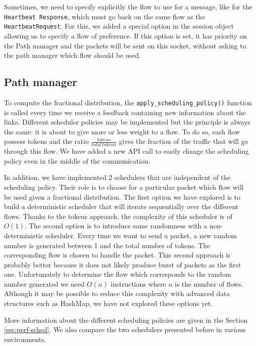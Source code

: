 Sometimes, we need to specify explicitly the flow to use for a message, like for the \texttt{Heartbeat Response}, which must go back on the same flow as the \texttt{HeartbeatRequest}. For this, we added a special option in the session object allowing us to specify a flow of preference. If this option is set, it has priority on the Path manager and the packets will be sent on this socket, without asking to the path manager which flow should be used.

\subsection{Path manager}\label{ssec:pathmanager}

To compute the fractional distribution, the \texttt{apply\_scheduling\_policy()} function is called every time we receive a feedback containing new information about the links. Different scheduler policies may be implemented but the principle is always the same: it is about to give more or less weight to a flow. To do so, each flow possess tokens and the ratio $\frac{tokens}{total\,tokens}$ gives the fraction of the traffic that will go through this flow. We have added a new API call to easily change the scheduling policy even in the middle of the communication.

In addition, we have implemented 2 schedulers that are independent of the scheduling policy. Their role is to choose for a particular packet which flow will be used given a fractional distribution. The first option we have explored is to build a deterministic scheduler that will iterate sequentially over the different flows. Thanks to the tokens approach, the complexity of this scheduler is of $O(1)$. The second option is to introduce some randomness with a non-deterministic scheduler. Every time we want to send a packet, a new random number is generated between 1 and the total number of tokens. The corresponding flow is chosen to handle the packet. This second approach is probably better because it does not likely produce burst of packets as the first one. Unfortunately to determine the flow which corresponds to the random number generated we need $O(n)$ instructions where $n$ is the number of flows. Although it may be possible to reduce this complexity with advanced data structures such as HashMap, we have not explored these options yet.

More information about the different scheduling policies are given in the Section \ref{sec:perf-sched}. We also compare the two schedulers presented before in various environments.

